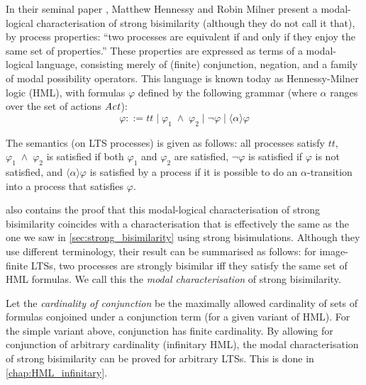 %
\begin{isabellebody}%
%
%
\isadelimtheory
%
\endisadelimtheory
%
\isatagtheory
%
\endisatagtheory
{\isafoldtheory}%
%
\isadelimtheory
%
\endisadelimtheory
%
\isadelimdocument
%
\endisadelimdocument
%
\isatagdocument
%
\isamarkuptrue%
%
\endisatagdocument
{\isafolddocument}%
%
\isadelimdocument
%
\endisadelimdocument
%
\begin{isamarkuptext}%
\label{sec:HML}%
\end{isamarkuptext}\isamarkuptrue%
%
\begin{isamarkuptext}%
In their seminal paper \cite{hm85}, Matthew Hennessy and Robin Milner present a modal-logical characterisation of strong bisimilarity (although they do not call it that), by process properties: \enquote{two processes are equivalent if and only if they enjoy the same set of properties.} These properties are expressed as terms of a modal-logical language, consisting merely of (finite) conjunction, negation, and a family of modal possibility operators. This language is known today as Hennessy-Milner logic (HML), with formulas $\varphi$ defined by the following grammar (where $\alpha$ ranges over the set of actions $\mathit{Act}$):
$$\varphi ::= t\!t \mid \varphi_1 \;\wedge\; \varphi_2 \mid \neg\varphi \mid \langle\alpha\rangle\varphi$$

The semantics (on LTS processes) is given as follows: all processes satisfy $t\!t$, $\varphi_1 \;\wedge\; \varphi_2$ is satisfied if both $\varphi_1$ and $\varphi_2$ are satisfied, $\neg\varphi$ is satisfied if $\varphi$ is not satisfied, and $\langle\alpha\rangle\varphi$ is satisfied by a process if it is possible to do an $\alpha$-transition into a process that satisfies $\varphi$.

\cite{hm85} also contains the proof that this modal-logical characterisation of strong bisimilarity coincides with a characterisation that is effectively the same as the one we saw in \cref{sec:strong_bisimilarity} using strong bisimulations. Although they use different terminology, their result can be summarised as follows: for image-finite LTSs, two processes are strongly bisimilar iff they satisfy the same set of HML formulas. We call this the \emph{modal characterisation} of strong bisimilarity.

Let the \emph{cardinality of conjunction} be the maximally allowed cardinality of sets of formulas conjoined under a conjunction term (for a given variant of HML). For the simple variant above, conjunction has finite cardinality. By allowing for conjunction of arbitrary cardinality (infinitary HML), the modal characterisation of strong bisimilarity can be proved for arbitrary LTSs. This is done in \cref{chap:HML_infinitary}.


\end{isamarkuptext}
\end{isabellebody}
